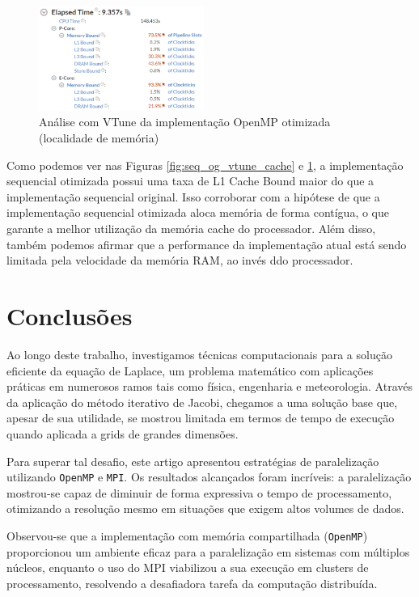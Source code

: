 \documentclass[conference]{IEEEtran}
\begin{document}
\begin{figure}[H]
    \centering
    \includegraphics[width=0.48\textwidth]{images/seq_opt_vtune_cache.png}
    \caption{Análise com VTune da implementação OpenMP otimizada (localidade de memória)}
    \label{fig:seq_opt_vtune_cache}
\end{figure}

Como podemos ver nas Figuras \ref{fig:seq_og_vtune_cache} e \ref{fig:seq_opt_vtune_cache}, a implementação sequencial otimizada possui uma taxa de L1 Cache Bound maior do que a implementação sequencial original. Isso corroborar com a hipótese de que a implementação sequencial otimizada aloca memória de forma contígua, o que garante a melhor utilização da memória cache do processador. Além disso, também podemos afirmar que a performance da implementação atual está sendo limitada pela velocidade da memória RAM, ao invés ddo processador.

\section{Conclusões}

Ao longo deste trabalho, investigamos técnicas computacionais para a solução eficiente da equação de Laplace, um problema matemático com aplicações práticas em numerosos ramos tais como física, engenharia e meteorologia. Através da aplicação do método iterativo de Jacobi, chegamos a uma solução base que, apesar de sua utilidade, se mostrou limitada em termos de tempo de execução quando aplicada a grids de grandes dimensões.

Para superar tal desafio, este artigo apresentou estratégias de paralelização utilizando \texttt{OpenMP} e \texttt{MPI}. Os resultados alcançados foram incríveis: a paralelização mostrou-se capaz de diminuir de forma expressiva o tempo de processamento, otimizando a resolução mesmo em situações que exigem altos volumes de dados.

Observou-se que a implementação com memória compartilhada (\texttt{OpenMP}) proporcionou um ambiente eficaz para a paralelização em sistemas com múltiplos núcleos, enquanto o uso do MPI viabilizou a sua execução em clusters de processamento, resolvendo a desafiadora tarefa da computação distribuída.
\end{document}
